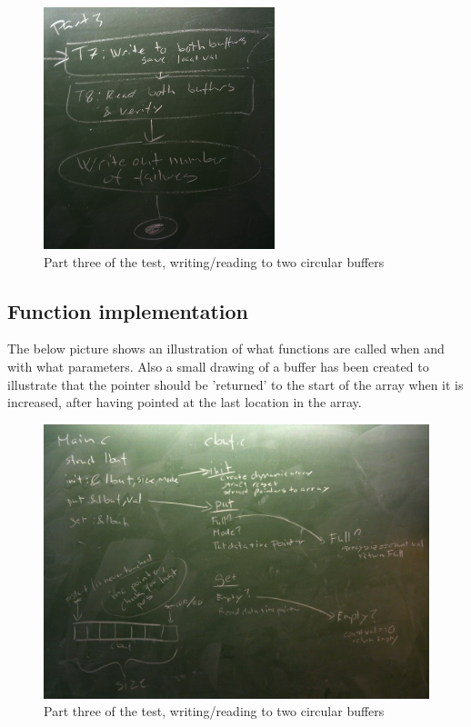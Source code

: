 \begin{figure}[bh!]		%
	\begin{centering}
 		\includegraphics[width=0.6\textwidth]{part3.jpg}
		\caption{Part three of the test, writing/reading to two circular buffers}
	\end{centering}
\end{figure}
\newpage
\subsection{Function implementation}
The below picture shows an illustration of what functions are called when and with what parameters. Also a small drawing of a buffer has been created to illustrate that
the pointer should be 'returned' to the start of the array when it is increased, after having pointed at the last location in the array.
\begin{figure}[bh!]		%
	\begin{centering}
 		\includegraphics[width=1.0\textwidth]{files.jpg}
		\caption{Part three of the test, writing/reading to two circular buffers}
	\end{centering}
\end{figure}
\newpage
